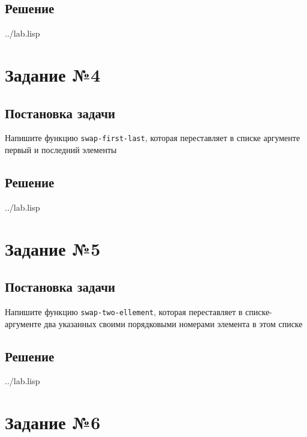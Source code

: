 \subsection*{Решение}
\begin{lstinputlisting}[label=third,caption=Решение задания №3, language=lisp, firstline=25, lastline=33]{../lab.lisp}
\end{lstinputlisting}

\section*{Задание №4}
\subsection*{Постановка задачи}
Напишите функцию \texttt{swap-first-last}, которая переставляет в списке аргументе первый и последний элементы

\subsection*{Решение}
\begin{lstinputlisting}[label=third,caption=Решение задания №4, language=lisp, firstline=39, lastline=42]{../lab.lisp}
\end{lstinputlisting}

\section*{Задание №5}
\subsection*{Постановка задачи}
Напишите функцию \texttt{swap-two-ellement}, которая переставляет в списке-аргументе два указанных своими порядковыми номерами элемента в этом списке

\subsection*{Решение}
\begin{lstinputlisting}[label=third,caption=Решение задания №5, language=lisp, firstline=47, lastline=57]{../lab.lisp}
\end{lstinputlisting}

\section*{Задание №6}
